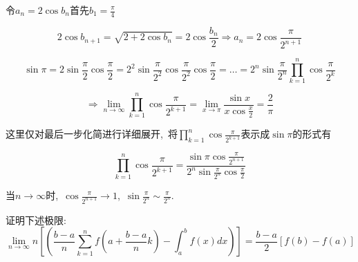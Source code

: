 	\begin{solution}
		令$a_n = 2\cos b_n$首先$b_1 = \frac{\pi}{4}$
		
		$$2\cos b_{n+1} = \sqrt{2+2\cos b_n}=2\cos \frac{b_n}{2}\Rightarrow a_n = 2\cos \frac{\pi}{2^{n+1}}$$
		
		$$\sin \pi = 2\sin \frac{\pi}{2}\cos \frac{\pi}{2} = 2^2\sin\frac{\pi}{2^2}\cos\frac{\pi}{2^2}\cos \frac{\pi}{2}=\dots=2^n\sin\frac{\pi}{2^n}\prod\limits_{k=1}^{n}\cos \frac{\pi}{2^k}$$
		
		$$\Rightarrow\lim\limits_{n\rightarrow\infty}\prod\limits_{k=1}^{n}\cos \frac{\pi}{2^{k+1}}=\lim\limits_{x\rightarrow \pi}\frac{\sin x}{x\cos\frac{x}{2}} = \frac{2}{\pi}$$ 
		
		这里仅对最后一步化简进行详细展开,\ 将$\prod\limits_{k=1}^{n}\cos \frac{\pi}{2^{k+1}}$表示成$\sin \pi$的形式有
		
		$$\prod\limits_{k=1}^{n}\cos \frac{\pi}{2^{k+1}} = \frac{\sin \pi \cos \frac{\pi}{2^{n+1}}}{2^n\sin \frac{\pi}{2^n}\cos\frac{\pi}{2}}$$
		
		当$n\rightarrow \infty$时,\ $\cos \frac{\pi}{2^{n+1}}\rightarrow 1$,\ $\sin \frac{\pi}{2^n}\sim \frac{\pi}{2^n}.$
	\end{solution}
	\newpage
	\begin{problem}
		证明下述极限:$$\lim\limits_{n\rightarrow\infty}n\left[\left(\frac{b-a}{n}\sum\limits_{k=1}^{n}f\left(a+\frac{b-a}{n}k\right)-\int_{a}^{b}f(x)dx\right)\right]=\frac{b-a}{2}\left[f(b)-f(a)\right]$$
	\end{problem}
	
